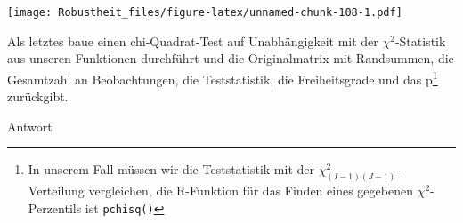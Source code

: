 \documentclass[
]{book}
\newenvironment{Shaded}{\begin{snugshade}}{\end{snugshade}}
\newcommand{\AttributeTok}[1]{\textcolor[rgb]{0.77,0.63,0.00}{#1}}
\newcommand{\DecValTok}[1]{\textcolor[rgb]{0.00,0.00,0.81}{#1}}
\newcommand{\FunctionTok}[1]{\textcolor[rgb]{0.00,0.00,0.00}{#1}}
\newcommand{\NormalTok}[1]{#1}
\newcommand{\OtherTok}[1]{\textcolor[rgb]{0.56,0.35,0.01}{#1}}
\newcommand{\SpecialCharTok}[1]{\textcolor[rgb]{0.00,0.00,0.00}{#1}}
\newcommand{\StringTok}[1]{\textcolor[rgb]{0.31,0.60,0.02}{#1}}
\begin{document}
\begin{Shaded}
\end{Shaded}

\texttt{[image: Robustheit\_files/figure-latex/unnamed-chunk-108-1.pdf]}

Als letztes baue einen chi-Quadrat-Test auf Unabhängigkeit mit der \(\chi^2\)-Statistik aus unseren Funktionen durchführt und die Originalmatrix mit Randsummen, die Gesamtzahl an Beobachtungen, die Teststatistik, die Freiheitsgrade und das p\footnote{In unserem Fall müssen wir die Teststatistik mit der \(\chi^2_{(I-1)(J-1)}\)-Verteilung vergleichen, die R-Funktion für das Finden eines gegebenen \(\chi^2\)-Perzentils ist \texttt{pchisq()}} zurückgibt.

Antwort
\end{document}
